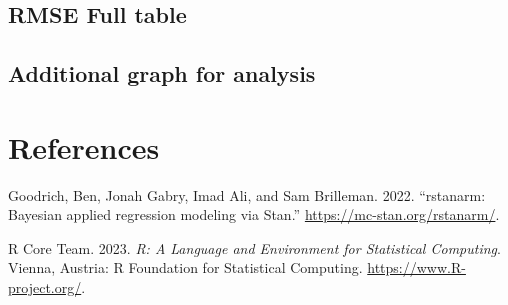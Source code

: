 \documentclass[
  letterpaper,
  DIV=11,
  numbers=noendperiod]{scrartcl}
\newlength{\cslhangindent}
\newenvironment{CSLReferences}[2] %
 {\begin{list}{}{%
  \setlength{\itemindent}{0pt}
  \setlength{\leftmargin}{0pt}
  \setlength{\parsep}{0pt}
  \ifodd #1
   \setlength{\leftmargin}{\cslhangindent}
   \setlength{\itemindent}{-1\cslhangindent}
  \fi
  \setlength{\itemsep}{#2\baselineskip}}}
 {\end{list}}
\begin{document}
\subsection{RMSE Full table}\label{rmse-full-table}

\subsection{Additional graph for
analysis}\label{additional-graph-for-analysis}

\newpage

\section*{References}\label{references}

\label{refs}
\begin{CSLReferences}{1}{0}
Goodrich, Ben, Jonah Gabry, Imad Ali, and Sam Brilleman. 2022.
{``{rstanarm: {Bayesian} applied regression modeling via {Stan}}.''}
\url{https://mc-stan.org/rstanarm/}.

R Core Team. 2023. \emph{{R: A Language and Environment for Statistical
Computing}}. Vienna, Austria: R Foundation for Statistical Computing.
\url{https://www.R-project.org/}.

\end{CSLReferences}
\end{document}
